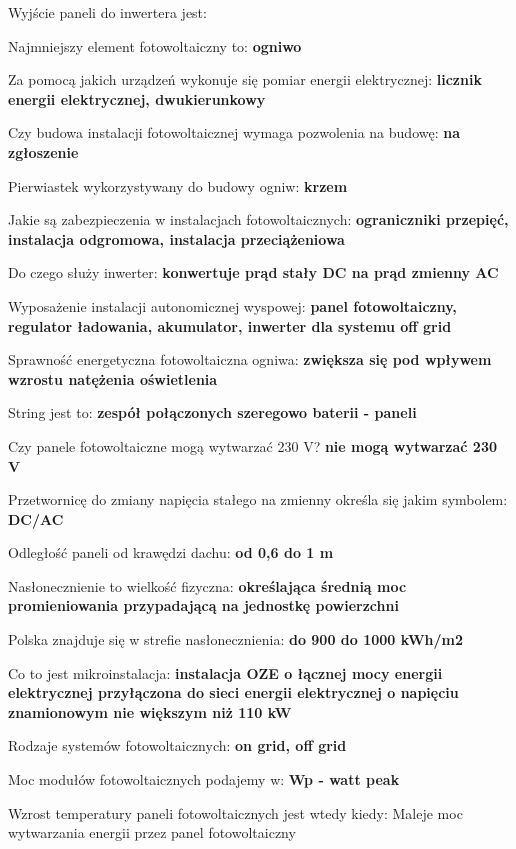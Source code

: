 \documentclass{article}
\begin{document}
Wyjście paneli do inwertera jest:  \textbf{} 

Najmniejszy element fotowoltaiczny to: \textbf{ogniwo}

Za pomocą jakich urządzeń wykonuje się pomiar energii elektrycznej: \textbf{licznik energii elektrycznej, dwukierunkowy}

Czy budowa instalacji fotowoltaicznej wymaga pozwolenia na budowę:  \textbf{na zgłoszenie}

Pierwiastek wykorzystywany do budowy ogniw: \textbf{krzem}

Jakie są zabezpieczenia w instalacjach fotowoltaicznych: \textbf{ograniczniki przepięć, instalacja odgromowa, instalacja przeciążeniowa}

Do czego służy inwerter: \textbf{konwertuje prąd stały DC na prąd zmienny AC}

Wyposażenie instalacji  autonomicznej wyspowej: \textbf{panel fotowoltaiczny, regulator ładowania, akumulator, inwerter dla systemu off grid}

Sprawność energetyczna fotowoltaiczna ogniwa: \textbf{zwiększa się pod wpływem wzrostu natężenia oświetlenia}

String jest to: \textbf{zespół połączonych szeregowo baterii - paneli}

Czy panele fotowoltaiczne mogą wytwarzać 230 V? \textbf{nie mogą wytwarzać 230 V}

Przetwornicę do zmiany napięcia stałego na zmienny określa się jakim symbolem: \textbf{DC/AC}

Odległość paneli od krawędzi dachu: \textbf{od 0,6 do 1 m}

Nasłonecznienie to wielkość fizyczna: \textbf{określająca średnią moc promieniowania przypadającą na jednostkę powierzchni}

Polska znajduje się w strefie nasłonecznienia: \textbf{do 900 do 1000 kWh/m2}

Co to jest mikroinstalacja: \textbf{instalacja OZE o łącznej mocy energii elektrycznej przyłączona do sieci energii elektrycznej o napięciu znamionowym nie większym niż 110 kW}

Rodzaje systemów fotowoltaicznych: \textbf{on grid, off grid}

Moc modułów fotowoltaicznych podajemy w: \textbf{Wp - watt peak}

Wzrost temperatury paneli fotowoltaicznych jest wtedy kiedy:
Maleje moc wytwarzania energii przez panel fotowoltaiczny
\end{document}
